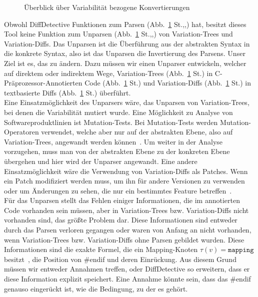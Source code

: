 \begin{figure}[H]
	\centering
	\vaShow
	\caption{Überblick über Variabilität bezogene Konvertierungen}
	\label{fig:1}
\end{figure}


Obwohl DiffDetective Funktionen zum Parsen (Abb.~\ref{fig:1} St.,,) hat, besitzt dieses Tool keine Funktion zum Unparsen (Abb.~\ref{fig:1} St.,,) von Variation-Trees und Variation-Diffs. Das Unparsen ist die Überführung aus der abstrakten Syntax in die konkrete Syntax, also ist das Unparsen die Invertierung des Parsens. Unser Ziel ist es, das zu ändern. Dazu müssen wir einen Unparser entwickeln, welcher auf direktem oder indirektem Wege, Variation-Trees (Abb.~\ref{fig:1} St.) in C-Präprozessor-Annotierten Code (Abb.~\ref{fig:1} St.) und Variation-Diffs (Abb.~\ref{fig:1} St.) in textbasierte Diffs (Abb.~\ref{fig:1} St.) überführt.\\

Eine Einsatzmöglichkeit des Unparsers wäre, das Unparsen von Variation-Trees, bei denen die Variabilität mutiert wurde. Eine Möglichkeit zu Analyse von Softwareproduktlinien ist Mutation-Tests. Bei Mutation-Tests werden Mutation-Operatoren verwendet, welche aber nur auf der abstrakten Ebene, also auf Variation-Trees, angewandt werden können~\cite{ABT+:VaMoS16}. Um weiter in der Analyse vorzugehen, muss man von der abstrakten Ebene zu der konkreten Ebene übergehen und hier wird der Unparser angewandt. Eine andere Einsatzmöglichkeit wäre die Verwendung von Variation-Diffs als Patches. Wenn ein Patch modifiziert werden muss, um ihn für andere Versionen zu verwenden oder um Änderungen zu sehen, die nur ein bestimmtes Feature betreffen~\cite{BSG+:SPLC23}.\\


Für das Unparsen stellt das Fehlen einiger Informationen, die im annotierten Code vorhanden sein müssen, aber in Variation-Trees bzw. Variation-Diffs nicht vorhanden sind, das größte Problem dar. Diese Informationen sind entweder durch das Parsen verloren gegangen oder waren von Anfang an nicht vorhanden, wenn Variation-Trees bzw. Variation-Diffs ohne Parsen gebildet wurden. Diese Informationen sind die exakte Formel, die ein Mapping-Knoten $\tau(v) = \texttt{mapping}$ besitzt~\cite{BTS+:ESECFSE22}, die Position von \#endif und deren Einrückung. Aus diesem Grund müssen wir entweder Annahmen treffen, oder DiffDetective so erweitern, dass er diese Information explizit speichert. Eine Annahme könnte sein, dass das \#endif genauso eingerückt ist, wie die Bedingung, zu der es gehört.\\


